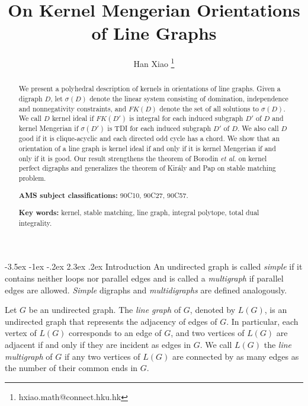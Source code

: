 \documentclass[11pt]{article}
\title{{\Large\bf  On Kernel Mengerian Orientations of Line Graphs}}
\date{}
\author{Han Xiao \footnote{hxiao.math@connect.hku.hk}}
\affil{Department of Mathematics, 

The University of Hong Kong,

Hong Kong, China
}
\makeatletter
\numberwithin{theorem}{section}
\renewcommand\section{%
  \@startsection{section}{1}
                {\z@}%
                {-3.5ex \@plus -1ex \@minus -.2ex}%
                {2.3ex \@plus.2ex}%
                {\large\bfseries}%
}
\makeatother
\begin{document}

\maketitle

\jot

\hfill

\begin{abstract}
We present a polyhedral description of kernels in orientations of line graphs.
Given a digraph $D$, let $\sigma(D)$ denote the linear system consisting of domination, independence and nonnegativity constraints, and $FK(D)$ denote the set of all solutions to $\sigma(D)$. We call $D$ kernel ideal if $FK(D')$ is integral for each induced subgraph $D'$ of $D$ and kernel Mengerian if $\sigma(D')$ is TDI for each induced subgraph $D'$ of $D$. We also call $D$ good if it is clique-acyclic and each directed odd cycle has a chord.
We show that an orientation of a line graph is kernel ideal if and only if it is kernel Mengerian if and only if it is good. Our result strengthens the theorem of Borodin \textit{et al.} \cite{BoroKost98} on kernel perfect digraphs and generalizes the theorem of Kir\'{a}ly and Pap \cite{KiraPap08} on stable matching problem.

\hfill

\hfill

\noindent\textbf{AMS subject classifications:} 90C10, 90C27, 90C57.


\noindent\textbf{Key words:} kernel, stable matching, line graph, integral polytope, total dual integrality.
\end{abstract}


\newpage
\section{Introduction}
\label{intro}
An undirected graph is called \textit{simple} if it contains neither loops nor parallel edges and is called a \textit{multigraph} if parallel edges are allowed. 
\textit{Simple} digraphs and \textit{multidigraphs} are defined analogously. 

Let $G$ be an undirected graph.
The \textit{line graph} of $G$, denoted by $L(G)$, is an undirected graph that represents the adjacency of edges of $G$. 
In particular, each vertex of $L(G)$ corresponds to an edge of $G$, and two vertices of $L(G)$ are adjacent if and only if they are incident as edges in $G$.
We call $L(G)$ the \textit{line multigraph} of $G$ if any two vertices of $L(G)$ are connected by as many edges as the number of their common ends in $G$. 
\end{document}
